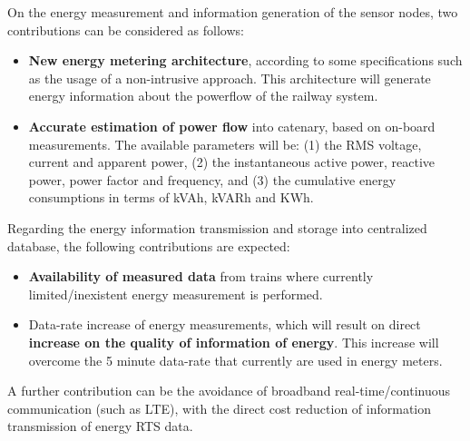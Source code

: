 On the energy measurement and information generation of the sensor nodes, two contributions can be considered as follows:

\begin{itemize}
	\setlength\itemsep{0em}
	
	\item \textbf{New energy metering architecture}, according to some specifications such as the usage of a non-intrusive approach.
	This architecture will generate energy information about the powerflow of the railway system.
	
	\item \textbf{Accurate estimation of power flow} into catenary, based on on-board measurements. The available parameters will be: (1) the RMS voltage, current and apparent power, (2) the instantaneous active power, reactive power, power factor and frequency, and (3) the cumulative energy consumptions in terms of kVAh, kVARh and KWh.
	
	
\end{itemize}


Regarding the energy information transmission and storage into centralized database, the following contributions are expected:


\begin{itemize}
	\setlength\itemsep{0em}
	
	\item \textbf{Availability of measured data} from trains where currently limited/inexistent energy measurement is performed.
	
	\item Data-rate increase of energy measurements, which will result on direct \textbf{increase on the quality of information of energy}. This increase will overcome the 5 minute data-rate that currently are used in energy meters.

	
	
\end{itemize}

A further contribution can be the avoidance of broadband real-time/continuous communication (such as LTE), with the direct cost reduction of information transmission of energy RTS data.

